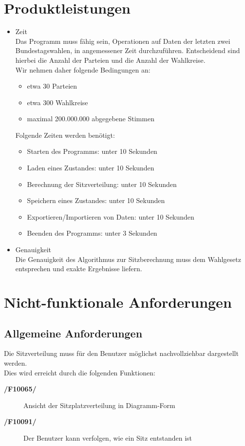 \documentclass[10pt,a4paper]{article}
\begin{document}
\section{Produktleistungen}
\begin{itemize}
	\item Zeit \hfill \\
	Das Programm muss fähig sein, Operationen auf Daten der letzten zwei Bundestagswahlen, in angemessener Zeit durchzuführen. Entscheidend sind hierbei die Anzahl der Parteien und die Anzahl der Wahlkreise.
	\\ Wir nehmen daher folgende Bedingungen an:
	\begin{itemize}
		\item etwa 30 Parteien
		\item etwa 300 Wahlkreise
		\item maximal 200.000.000 abgegebene Stimmen
	\end{itemize}
	Folgende Zeiten werden benötigt:
	\begin{itemize}
		\item Starten des Programms: unter 10 Sekunden
		\item Laden eines Zustandes: unter 10 Sekunden
		\item Berechnung der Sitzverteilung: unter 10 Sekunden
		\item Speichern eines Zustandes: unter 10 Sekunden
		\item Exportieren/Importieren von Daten: unter 10 Sekunden
		\item Beenden des Programms: unter 3 Sekunden
	\end{itemize}
	\item Genauigkeit \hfill \\
	Die Genauigkeit des Algorithmus zur Sitzberechnung muss dem Wahlgesetz entsprechen und exakte Ergebnisse liefern.
\end{itemize}


\section{Nicht-funktionale Anforderungen}
\subsection{Allgemeine Anforderungen}
Die Sitzverteilung muss für den Benutzer möglichst nachvollziehbar dargestellt werden. \hfill \\
Dies wird erreicht durch die folgenden Funktionen:
\begin{description}
	\item[\textbf{/F10065/}] Ansicht der Sitzplatzverteilung in Diagramm-Form
	\item[\textbf{/F10091/}] Der Benutzer kann verfolgen, wie ein Sitz entstanden ist
\end{description}
\end{document}
